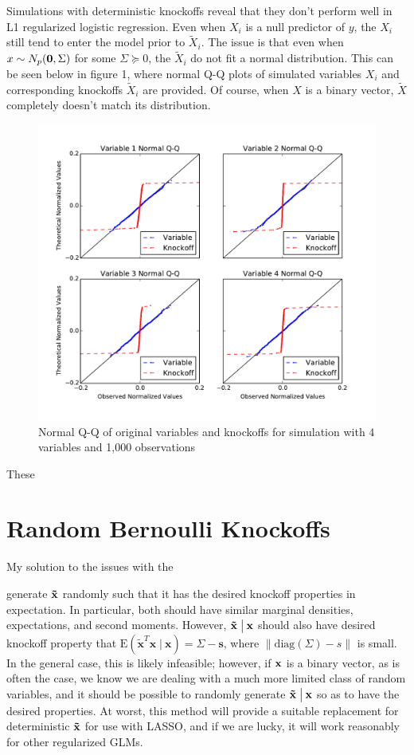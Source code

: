\documentclass[11pt]{article}
\newcommand{\E}{\mathrm{E}}
\newcommand{\diag}{\mathrm{diag}}
\newcommand{\st}{ \; \big | \:}
\theoremstyle{definition}
\begin{document}
    Simulations with deterministic knockoffs reveal that they don't perform well in L1 regularized logistic regression. Even when $X_i$ is a null predictor of $y$, the $X_i$ still tend to enter the model prior to $\tilde X_i$. The issue is that even when $x\sim N_p({\bf 0}, \Sigma)$ for some $\Sigma\succeq 0$, the $\tilde X_i$ do not fit a normal distribution. This can be seen below in figure 1, where normal Q-Q plots of simulated variables $X_i$ and corresponding knockoffs $\tilde X_i$ are provided. Of course, when $X$ is a binary vector, $\tilde X$ completely doesn't match its distribution.
    \begin{figure}[h!]
        \includegraphics[width=20cm]{images/normalQQ}
        \caption{Normal Q-Q of original variables and knockoffs for simulation with $4$ variables and 1,000 observations}
    \end{figure}
    These 
    

\section{Random Bernoulli Knockoffs}
    My solution to the issues with the 

     generate $\bf \tilde x$ randomly such that it has the desired knockoff properties in expectation. In particular, both  should have similar marginal densities, expectations, and second moments. However, $\bf \tilde x\st \bf x$ should also have desired knockoff property that $\E(\mathbf{\tilde x}^T\mathbf x\st \mathbf x) = \Sigma-\mathbf s$, where $\|\diag(\Sigma)-s\|$ is small. In the general case, this is likely infeasible; however, if $\bf x$ is a binary vector, as is often the case, we know we are dealing with a much more limited class of random variables, and it should be possible to randomly generate $\bf \tilde x\st \bf x$ so as to have the desired properties. At worst, this method will provide a suitable replacement for deterministic $\bf \tilde x$ for use with LASSO, and if we are lucky, it will work reasonably for other regularized GLMs. 
\end{document}
